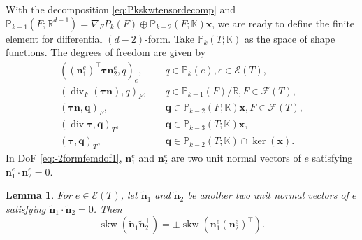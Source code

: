 \documentclass[10pt]{amsart}
\newtheorem{lemma}[theorem]{Lemma}
\renewcommand{\div}{\operatorname{div}}
\newcommand{\skw}{\operatorname{skw}}
\numberwithin{equation}{section}
\begin{document}
With the decomposition \eqref{eq:Pkskwtensordecomp} and $\mathbb P_{k-1}(F;\mathbb R^{d-1})=\nabla_FP_k(F)\oplus\mathbb P_{k-2}(F;\mathbb K)\boldsymbol{x}$, we are ready to define the finite element for differential $(d-2)$-form. Take $\mathbb P_k(T;\mathbb K)$ as the space of shape functions. The degrees of freedom are given by
\begin{align}
((\boldsymbol{n}_1^e)^{\intercal}\boldsymbol{\tau}\boldsymbol{n}_2^e, q)_e, & \quad q\in \mathbb P_k(e), e\in\mathcal E(T), \label{eq:-2formfemdof1} \\
(\div_F(\boldsymbol{\tau}\boldsymbol{n}), q)_F, & \quad q\in \mathbb P_{k-1}(F)/\mathbb R, F\in\mathcal F(T), \label{eq:-2formfemdof21} \\
(\boldsymbol{\tau}\boldsymbol{n}, \boldsymbol{q})_F, & \quad \boldsymbol{q}\in \mathbb P_{k-2}(F;\mathbb K)\boldsymbol{x}, F\in\mathcal F(T), \label{eq:-2formfemdof22} \\
(\div\boldsymbol{\tau}, \boldsymbol{q})_T, & \quad \boldsymbol{q}\in\mathbb P_{k-3}(T;\mathbb K)\boldsymbol{x}, \label{eq:-2formfemdof31} \\
(\boldsymbol{\tau}, \boldsymbol{q})_T, & \quad \boldsymbol{q}\in \mathbb P_{k-2}(T;\mathbb K)\cap\ker(\boldsymbol{x}). \label{eq:-2formfemdof32}
\end{align}
In DoF \eqref{eq:-2formfemdof1}, $\boldsymbol{n}_1^e$ and  $\boldsymbol{n}_2^e$ are two unit normal vectors of $e$ satisfying $\boldsymbol{n}_1^e\cdot\boldsymbol{n}_2^e=0$. 
\begin{lemma}\label{lem:normalskwtensor}
For $e\in\mathcal E(T)$, let $\tilde{\boldsymbol{n}}_1$ and  $\tilde{\boldsymbol{n}}_2$ be another two unit normal vectors of $e$ satisfying $\tilde{\boldsymbol{n}}_1\cdot\tilde{\boldsymbol{n}}_2=0$. Then
$$
\skw(\tilde{\boldsymbol{n}}_1\tilde{\boldsymbol{n}}_2^{\intercal})=\pm\skw(\boldsymbol{n}_1^e(\boldsymbol{n}_2^e)^{\intercal}).
$$
\end{lemma}
\end{document}
